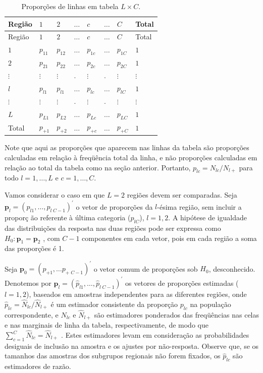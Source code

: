 \documentclass[]{book}
\numberwithin{example}{chapter}
\numberwithin{remark}{chapter}
\numberwithin{definition}{chapter}
\begin{document}
\begin{longtable}[]{@{}llllllll@{}}
\caption{\label{tab:proplinha} Proporções de linhas em tabela
\(L\times C\).}\tabularnewline
\toprule
Região & \(1\) & \(2\) & \(\ldots\) & \(c\) & \(\ldots\) & \(C\) &
Total\tabularnewline
\midrule
\endfirsthead
\toprule
Região & \(1\) & \(2\) & \(\ldots\) & \(c\) & \(\ldots\) & \(C\) &
Total\tabularnewline
\midrule
\endhead
\(1\) & \(p_{11}\) & \(p_{12}\) & \(\ldots\) & \(p_{1c}\) & \(\ldots\) &
\(p_{1C}\) & \(1\)\tabularnewline
\(2\) & \(p_{21}\) & \(p_{22}\) & \(\ldots\) & \(p_{2c}\) & \(\ldots\) &
\(p_{2C}\) & \(1\)\tabularnewline
\(\vdots\) & \(\vdots\) & \(\vdots\) & . & \(\vdots\) & . & \(\vdots\) &
\(\vdots\)\tabularnewline
\(l\) & \(p_{l1}\) & \(p_{l1}\) & \(\ldots\) & \(p_{lc}\) & \(\ldots\) &
\(p_{lC}\) & \(1\)\tabularnewline
\(\vdots\) & \(\vdots\) & \(\vdots\) & . & \(\vdots\) & . & \(\vdots\) &
\(\vdots\)\tabularnewline
\(L\) & \(p_{L1}\) & \(p_{L2}\) & \(\ldots\) & \(p_{Lc}\) & \(\ldots\) &
\(p_{LC}\) & \(1\)\tabularnewline
Total & \(p_{+1}\) & \(p_{+2}\) & \(\ldots\) & \(p_{+c}\) & \(\ldots\) &
\(p_{+C}\) & \(1\)\tabularnewline
\bottomrule
\end{longtable}

Note que aqui as proporções que aparecem nas linhas da tabela são
proporções calculadas em relação à freqüência total da linha, e não
proporções calculadas em relação ao total da tabela como na seção
anterior. Portanto, \(p_{lc}=N_{lc}/N_{l+}\) para todo \(l=1,\ldots ,L\)
e \(c=1,\ldots ,C\).

Vamos considerar o caso em que \(L=2\) regiões devem ser comparadas.
Seja
\(\mathbf{p}_{l}=\left( p_{l1},\ldots ,p_{l\;C-1}\right) ^{\prime }\) o
vetor de proporções da \(l\)-ésima região, sem incluir a proporç ão
referente à última categoria (\(p_{lC}\)), \(l=1,2.\) A hipótese de
igualdade das distribuições da resposta nas duas regiões pode ser
expressa como \(H_{0}:\mathbf{p}_{1}=\mathbf{p}_{2}\) , com \(C-1\)
componentes em cada vetor, pois em cada região a soma das proporções é
1.

Seja
\(\mathbf{p}_{0}=\left( p_{+1},\ldots p_{+\;C-1}\right) ^{\prime }\) o
vetor comum de proporções sob \(H_{0}\), desconhecido. Denotemos por
\(\mathbf{\hat{p}}_{l}=\left( \hat{p}_{l1},\ldots ,\hat{p} _{l\;C-1}\right) ^{\prime }\)
os vetores de proporções estimadas (\(l=1,2\)), baseados em amostras
independentes para as diferentes regiões, onde
\(\hat{p}_{lc}=\widehat{N}_{lc}/\widehat{N}_{l+}\) é um estimador
consistente da proporção \(p_{lc}\) na população correspondente, e
\(\widehat{N}_{lc}\) e \(\widehat{N}_{l+}\) são estimadores ponderados
das freqüências nas celas e nas marginais de linha da tabela,
respectivamente, de modo que
\(\sum\nolimits_{c=1}^{C} \widehat{N}_{lc}=\widehat{N}_{l+}\) . Estes
estimadores levam em consideração as probabilidades desiguais de
inclusão na amostra e os ajustes por não-resposta. Observe que, se os
tamanhos das amostras dos subgrupos regionais não forem fixados, os
\(\hat{p}_{lc}\) são estimadores de razão.
\end{document}
